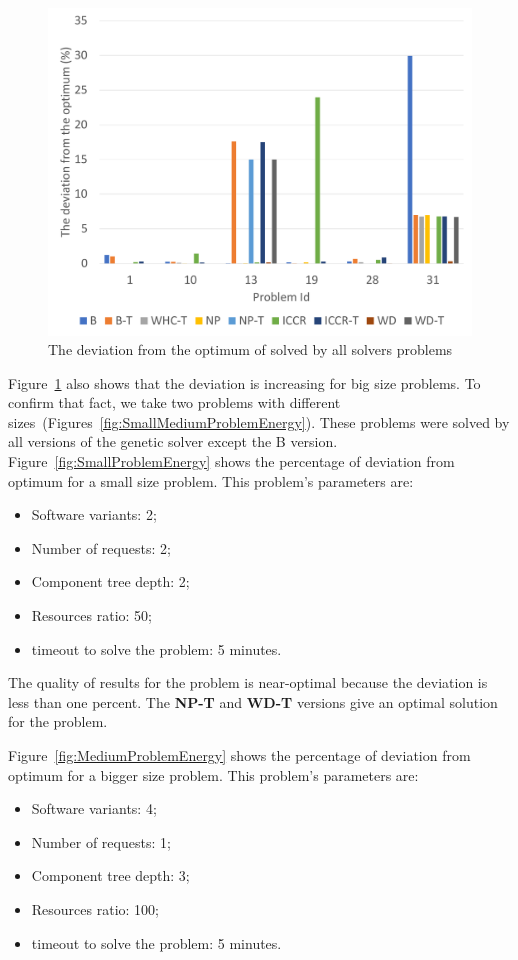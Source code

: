 \begin{figure}
	\centering
	\includegraphics[width=\textwidth]{images/EnergyPercentage.pdf}
	\caption[The deviation from the optimum of solved by all solvers problems]{The deviation from the optimum of solved by all solvers problems}
	\label{fig:EnergyPercentage}
\end{figure}

Figure~\ref{fig:EnergyPercentage} also shows that the deviation is increasing for big size problems. To confirm that fact, we take two problems with different sizes~(Figures~\ref{fig:SmallMediumProblemEnergy}). These problems were solved by all versions of the genetic solver except the B version. Figure~\ref{fig:SmallProblemEnergy} shows the percentage of deviation from optimum for a small size problem. This problem's parameters are:
\begin{itemize}
	\item Software variants: 2;
	\item Number of requests: 2;
	\item Component tree depth: 2;
	\item Resources ratio: 50;
	\item timeout to solve the problem: 5 minutes.
\end{itemize}

The quality of results for the problem is near-optimal because the deviation is less than one percent. The \textbf{NP-T} and \textbf{WD-T} versions give an optimal solution for the problem.

Figure~\ref{fig:MediumProblemEnergy} shows the percentage of deviation from optimum for a bigger size problem. This problem's parameters are:
\begin{itemize}
	\item Software variants: 4;
	\item Number of requests: 1;
	\item Component tree depth: 3;
	\item Resources ratio: 100;
	\item timeout to solve the problem: 5 minutes.
\end{itemize}



